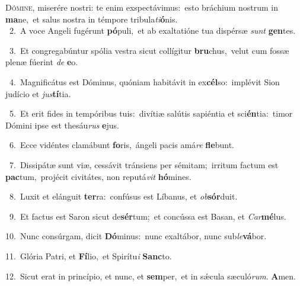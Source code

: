 \lettrine{\initial\textcolor{\initialcolor}{D}}{ómine,} miserére nostri: te enim exspectávimus:~\dagger esto bráchium nostrum in \textbf{ma}\-ne,~\star et salus nostra in témpore tribula\-\textit{ti}\-\textbf{ó}nis.\\
{\numbfont\textcolor{\numbcolor}{~2.}}~A voce Angeli fugérunt \textbf{pó}\-puli,~\star et ab exaltatióne tua dispérsæ \textit{sunt} \textbf{gen}\-tes.\par
{\numbfont\textcolor{\numbcolor}{~3.}}~Et congregabúntur spólia vestra sicut collígitur \textbf{bru}\-chus,~\star velut cum fossæ plenæ fúerint \textit{de} \textbf{e}\-o.\par
{\numbfont\textcolor{\numbcolor}{~4.}}~Magnificátus est Dóminus, quóniam habitávit in ex\-\textbf{cél}\-so:~\star implévit Sion judício et \textit{jus}\-\textbf{tí}tia.\par
{\numbfont\textcolor{\numbcolor}{~5.}}~Et erit fides in tempóribus tuis:~\dagger divítiæ salútis sapiéntia et sci\-\textbf{én}\-tia:~\star timor Dómini ipse est thesáu\textit{rus} \textbf{e}\-jus.\par
{\numbfont\textcolor{\numbcolor}{~6.}}~Ecce vidéntes clamábunt \textbf{fo}\-ris,~\star ángeli pacis amá\textit{re} \textbf{fle}\-bunt.\par
{\numbfont\textcolor{\numbcolor}{~7.}}~Dissipátæ sunt viæ, cessávit tránsiens per sémitam;~\dagger irritum factum est \textbf{pac}\-tum,~\star projécit civitátes, non reputá\textit{vit} \textbf{hó}\-mines.\par
{\numbfont\textcolor{\numbcolor}{~8.}}~Luxit et elánguit \textbf{ter}\-ra:~\star confúsus est Líbanus, et \textit{ob}\-\textbf{sór}duit.\par
{\numbfont\textcolor{\numbcolor}{~9.}}~Et factus est Saron sicut de\-\textbf{sér}\-tum;~\star et concússa est Basan, et \textit{Car}\-\textbf{mé}lus.\par
{\numbfont\textcolor{\numbcolor}{10.}}~Nunc consúrgam, dicit \textbf{Dó}\-minus:~\star nunc exaltábor, nunc sub\-\textit{le}\-\textbf{vá}bor.\par
{\numbfont\textcolor{\numbcolor}{11.}}~Glória Patri, et \textbf{Fí}\-lio,~\star et Spirítu\textit{i} \textbf{Sanc}\-to.\par
{\numbfont\textcolor{\numbcolor}{12.}}~Sicut erat in princípio, et nunc, et \textbf{sem}\-per,~\star et in sǽcula sæculó\-\textit{rum}\-. \textbf{A}\-men.\par
